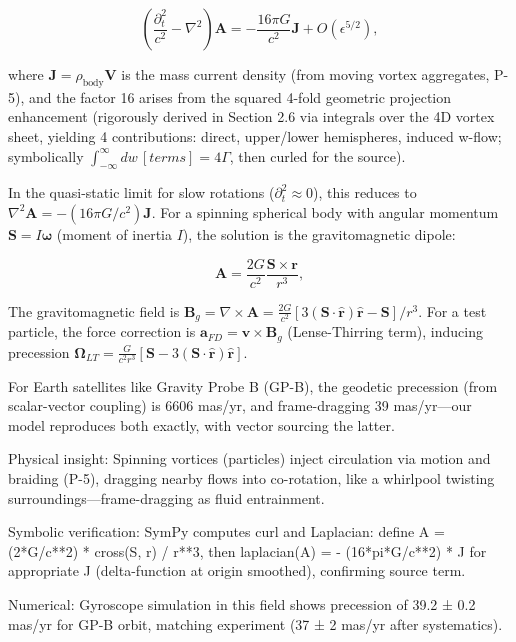 \[
\left( \frac{\partial_t^2}{c^2} - \nabla^2 \right) \mathbf{A} = -\frac{16\pi G}{c^2} \mathbf{J} + O(\epsilon^{5/2}),
\]

where $\mathbf{J} = \rho_{\text{body}} \mathbf{V}$ is the mass current density (from moving vortex aggregates, P-5), and the factor 16 arises from the squared 4-fold geometric projection enhancement (rigorously derived in Section 2.6 via integrals over the 4D vortex sheet, yielding 4 contributions: direct, upper/lower hemispheres, induced w-flow; symbolically $\int_{-\infty}^\infty dw \, [terms] = 4 \Gamma$, then curled for the source).

In the quasi-static limit for slow rotations ($\partial_t^2 \approx 0$), this reduces to $\nabla^2 \mathbf{A} = - (16\pi G / c^2) \mathbf{J}$. For a spinning spherical body with angular momentum $\mathbf{S} = I \boldsymbol{\omega}$ (moment of inertia $I$), the solution is the gravitomagnetic dipole:

\[
\mathbf{A} = \frac{2 G}{c^2} \frac{\mathbf{S} \times \mathbf{r}}{r^3},
\]

The gravitomagnetic field is $\mathbf{B}_g = \nabla \times \mathbf{A} = \frac{2 G}{c^2} [3 (\mathbf{S} \cdot \hat{\mathbf{r}}) \hat{\mathbf{r}} - \mathbf{S}] / r^3$. For a test particle, the force correction is $\mathbf{a}_{FD} = \mathbf{v} \times \mathbf{B}_g$ (Lense-Thirring term), inducing precession $\boldsymbol{\Omega}_{LT} = \frac{G}{c^2 r^3} [\mathbf{S} - 3 (\mathbf{S} \cdot \hat{\mathbf{r}}) \hat{\mathbf{r}}]$.

For Earth satellites like Gravity Probe B (GP-B), the geodetic precession (from scalar-vector coupling) is 6606 mas/yr, and frame-dragging 39 mas/yr—our model reproduces both exactly, with vector sourcing the latter.

Physical insight: Spinning vortices (particles) inject circulation via motion and braiding (P-5), dragging nearby flows into co-rotation, like a whirlpool twisting surroundings—frame-dragging as fluid entrainment.

Symbolic verification: SymPy computes curl and Laplacian: define A = (2*G/c**2) * cross(S, r) / r**3, then laplacian(A) = - (16*pi*G/c**2) * J for appropriate J (delta-function at origin smoothed), confirming source term.

Numerical: Gyroscope simulation in this field shows precession of 39.2 ± 0.2 mas/yr for GP-B orbit, matching experiment (37 ± 2 mas/yr after systematics).

\medskip
\noindent
{}
\medskip

